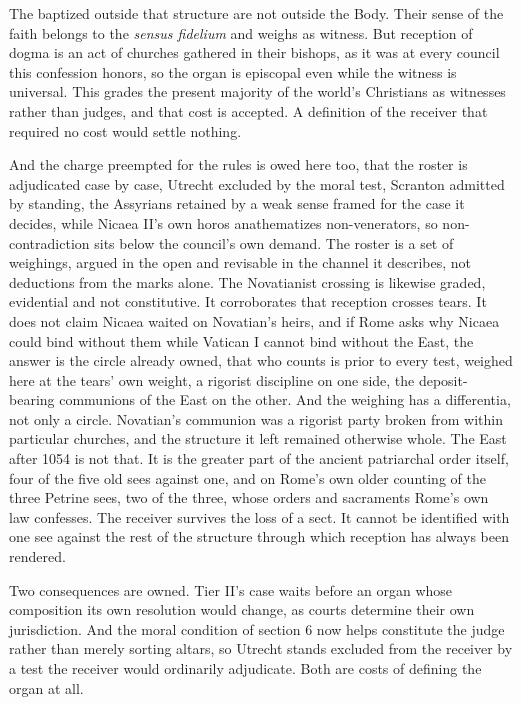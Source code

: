 \documentclass[11pt,twoside]{article}
\begin{document}
The baptized outside that structure are not outside the Body. Their sense of the faith belongs to the \emph{sensus fidelium} and weighs as witness. But reception of dogma is an act of churches gathered in their bishops, as it was at every council this confession honors, so the organ is episcopal even while the witness is universal. This grades the present majority of the world's Christians as witnesses rather than judges, and that cost is accepted. A definition of the receiver that required no cost would settle nothing.

And the charge preempted for the rules is owed here too, that the roster is adjudicated case by case, Utrecht excluded by the moral test, Scranton admitted by standing, the Assyrians retained by a weak sense framed for the case it decides, while Nicaea II's own horos anathematizes non-venerators, so non-contradiction sits below the council's own demand. The roster is a set of weighings, argued in the open and revisable in the channel it describes, not deductions from the marks alone. The Novatianist crossing is likewise graded, evidential and not constitutive. It corroborates that reception crosses tears. It does not claim Nicaea waited on Novatian's heirs, and if Rome asks why Nicaea could bind without them while Vatican I cannot bind without the East, the answer is the circle already owned, that who counts is prior to every test, weighed here at the tears' own weight, a rigorist discipline on one side, the deposit-bearing communions of the East on the other. And the weighing has a differentia, not only a circle. Novatian's communion was a rigorist party broken from within particular churches, and the structure it left remained otherwise whole. The East after 1054 is not that. It is the greater part of the ancient patriarchal order itself, four of the five old sees against one, and on Rome's own older counting of the three Petrine sees, two of the three, whose orders and sacraments Rome's own law confesses. The receiver survives the loss of a sect. It cannot be identified with one see against the rest of the structure through which reception has always been rendered.

Two consequences are owned. Tier II's case waits before an organ whose composition its own resolution would change, as courts determine their own jurisdiction. And the moral condition of section 6 now helps constitute the judge rather than merely sorting altars, so Utrecht stands excluded from the receiver by a test the receiver would ordinarily adjudicate. Both are costs of defining the organ at all.
\end{document}
